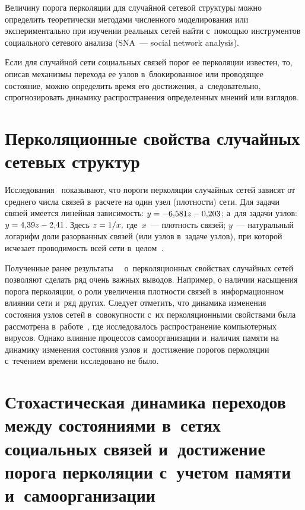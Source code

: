 \begin{multicols}{2}
  Величину порога перколяции для случайной сетевой структуры можно 
определить теоретически методами численного моделирования или 
экспериментально при изучении реальных сетей \mbox{найти} с~по\-мощью 
инструментов социального сетевого анализа (SNA~--- social network analysis).
  
  Если для случайной сети социальных связей порог ее перколяции известен, 
то, описав механизмы перехода ее узлов в~блокированное или проводящее 
состояние, можно определить время его достижения, а~следовательно, 
спрогнозировать динамику распространения определенных мнений или 
взглядов.
  
\section{Перколяционные свойства случайных сетевых структур}

  Исследования~\cite{1-hv, 10-hv, 11-hv, 12-hv, 13-hv, 14-hv} показывают, что 
пороги перколяции случайных сетей зависят от среднего числа связей в~расчете 
на один узел (плотности) сети. Для задачи связей имеется линейная 
зависимость: $y\hm= -6{,}581z\hm- 0{,}203$; а~для задачи узлов: $y\hm= 4{,}39 
z\hm- 2{,}41$. Здесь $z\hm=1/x,$ где~$x$~--- плот\-ность связей; $y$~--- натуральный 
логарифм доли разорванных связей (или узлов в~задаче узлов), при которой 
исчезает проводимость всей сети  
в~целом~\cite{11-hv, 12-hv, 13-hv, 14-hv, 15-hv, 16-hv, 17-hv}.
  
  Полученные ранее  
результаты~~\cite{11-hv, 12-hv, 13-hv, 14-hv, 15-hv, 16-hv, 17-hv} 
о~перколяционных свойствах случайных сетей позволяют сделать ряд очень 
важных выводов. Например, о наличии насыщения порога перколяции, о роли 
увеличения плотности связей в~информационном влиянии сети и~ряд других. 
Следует отметить, что динамика изменения состояния узлов сетей 
в~совокупности с~их перколяционными свойствами была рассмотрена 
в~работе~\cite{10-hv}, где исследовалось распространение компьютерных 
вирусов. Однако влияние процессов самоорганизации и~наличия памяти на 
динамику изменения состояния узлов и~достижение порогов перколяции 
с~течением времени исследовано не было.
  
\section{Стохастическая динамика переходов между состояниями 
в~сетях социальных связей и~достижение порога перколяции 
с~учетом памяти и~самоорганизации}


\end{multicols}
